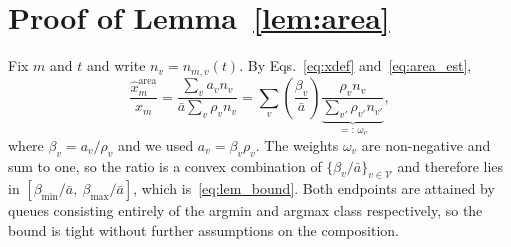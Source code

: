 \documentclass[journal]{IEEEtran}
\newcommand{\vc}{\mathcal{V}}
\begin{document}
\section{Proof of Lemma~\ref{lem:area}}
\label{app:lemma}
Fix $m$ and $t$ and write $n_v = n_{m,v}(t)$. By
Eqs.~\eqref{eq:xdef} and~\eqref{eq:area_est},
\begin{equation}
\frac{\hat{x}^{\mathrm{area}}_m}{x_m}
 = \frac{\sum_v a_v n_v}{\bar a \sum_v \rho_v n_v}
 = \sum_v \left(\frac{\beta_v}{\bar a}\right)
   \underbrace{\frac{\rho_v n_v}{\sum_{v'} \rho_{v'} n_{v'}}}_{=:\,\omega_v},
\end{equation}
where $\beta_v = a_v/\rho_v$ and we used $a_v = \beta_v \rho_v$. The
weights $\omega_v$ are non-negative and sum to one, so the ratio is a
convex combination of $\{\beta_v/\bar a\}_{v\in\vc}$ and therefore lies
in $[\beta_{\min}/\bar a,\ \beta_{\max}/\bar a]$, which
is~\eqref{eq:lem_bound}. Both endpoints are attained by queues consisting
entirely of the argmin and argmax class respectively, so the bound is
tight without further assumptions on the composition.
\end{document}
